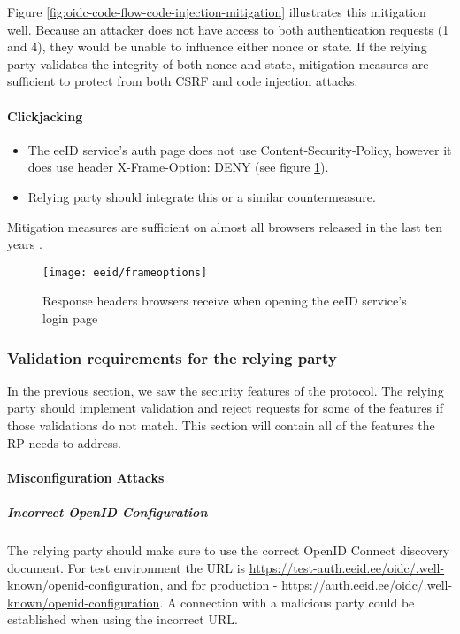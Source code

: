 Figure \ref{fig:oidc-code-flow-code-injection-mitigation} illustrates this mitigation well. Because an attacker does not have access to both authentication requests (1 and 4), they would be unable to influence either nonce or state. If the relying party validates the integrity of both nonce and state, mitigation measures are sufficient to protect from both CSRF and code injection attacks.

\paragraph{Clickjacking}

\begin{itemize}
  \item The eeID service's auth page does not use Content-Security-Policy, however it does use header X-Frame-Option: {DENY} (see figure \ref{fig:eeid-responseheaders}).
  \item Relying party should integrate this or a similar countermeasure.
\end{itemize}

Mitigation measures are sufficient on almost all browsers released in the last ten years \cite{caniuse-xframeoptions}.

\begin{figure}
  \centering
  \texttt{[image: eeid/frameoptions]}
  \caption{Response headers browsers receive when opening the eeID service's login page}
  \label{fig:eeid-responseheaders}
\end{figure}

\subsubsection{Validation requirements for the relying party}

In the previous section, we saw the security features of the protocol. The relying party should implement validation and reject requests for some of the features if those validations do not match. This section will contain all of the features the RP needs to address.

\paragraph{Misconfiguration Attacks}

\subparagraph{Incorrect OpenID Configuration}

The relying party should make sure to use the correct OpenID Connect discovery document. For test environment the URL is \url{https://test-auth.eeid.ee/oidc/.well-known/openid-configuration}, and for production - \url{https://auth.eeid.ee/oidc/.well-known/openid-configuration}. A connection with a malicious party could be established when using the incorrect URL.

